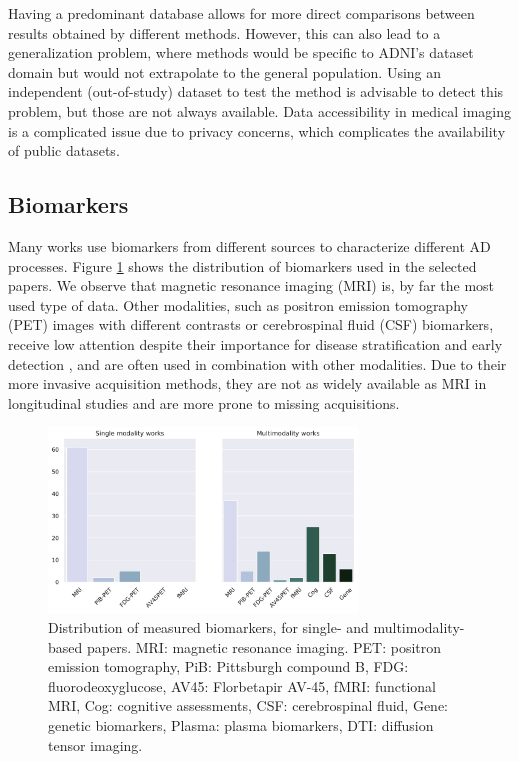 Having a predominant database allows for more direct comparisons between results obtained by different methods. However, this can also lead to a generalization problem, where methods would be specific to ADNI's dataset domain but would not extrapolate to the general population. Using an independent (out-of-study) dataset to test the method is advisable to detect this problem, but those are not always available. Data accessibility in medical imaging is a complicated issue due to privacy concerns, which complicates the availability of public datasets. \\

\subsection{Biomarkers}

Many works use biomarkers from different sources to characterize different AD processes. Figure \ref{fig:modalities} shows the distribution of biomarkers used in the selected papers. We observe that magnetic resonance imaging (MRI) is, by far the most used type of data. Other modalities, such as positron emission tomography (PET) images with different contrasts or cerebrospinal fluid (CSF) biomarkers, receive low attention despite their importance for disease stratification and early detection \cite{Andreasen1999,Clark2011,Weiner2005}, and are often used in combination with other modalities. Due to their more invasive acquisition methods, they are not as widely available as MRI in longitudinal studies and are more prone to missing acquisitions. \\

\begin{figure}[!htbp]
\centering
\includegraphics[width=0.73\textwidth]{figures/review/Fig6.pdf}
    \caption[Distribution of measured biomarkers, for single- and multimodality papers.]{\small Distribution of measured biomarkers, for single- and multimodality-based papers. MRI:  magnetic resonance imaging. PET: positron emission tomography, PiB: Pittsburgh compound B, FDG: fluorodeoxyglucose, AV45: Florbetapir AV-45, fMRI: functional MRI, Cog: cognitive assessments, CSF: cerebrospinal fluid, Gene: genetic biomarkers, Plasma: plasma biomarkers, DTI: diffusion tensor imaging.}\label{fig:modalities}
\end{figure}

